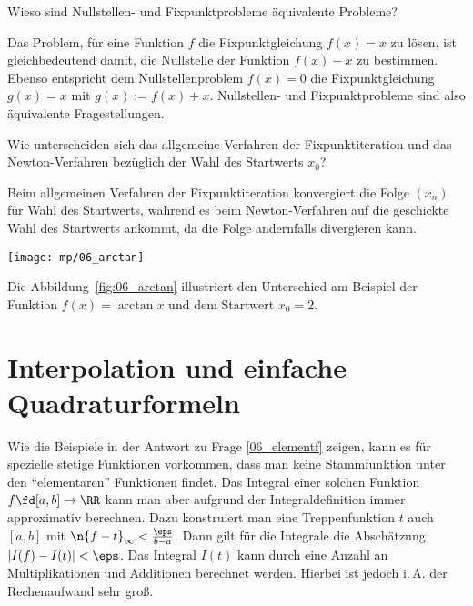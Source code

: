   \begin{frage}
    Wieso sind Nullstellen- und Fixpunktprobleme äquivalente Probleme?
  \end{frage}

  \begin{antwort}
    
    Das Problem, für eine Funktion $f$ die Fixpunktgleichung $f(x)=x$ 
    zu lösen, ist gleichbedeutend damit, die Nullstelle der Funktion 
    $f(x)-x$ zu bestimmen. Ebenso entspricht dem Nullstellenproblem $f(x)=0$ 
    die Fixpunktgleichung $g(x)=x$ mit $g(x):=f(x)+x$. 
    Nullstellen- und Fixpunktprobleme sind also äquivalente Fragestellungen. 
    \AntEnd
  \end{antwort}

  \begin{frage}
    Wie unterscheiden sich das allgemeine Verfahren der 
    Fixpunktiteration und das Newton-Verfahren bezüglich der Wahl des 
    Startwerts $x_0$?
  \end{frage}

  \begin{antwort}
    Beim allgemeinen Verfahren der Fixpunktiteration konvergiert die 
    Folge $(x_n)$ für  Wahl des Startwerts, 
    während es beim Newton-Verfahren auf die geschickte Wahl des Startwerts 
    ankommt, da die Folge andernfalls divergieren kann. 

    \begin{center}
      \texttt{[image: mp/06\_arctan]}
      \label{fig:06_arctan}
    \end{center}

    Die Abbildung~\ref{fig:06_arctan} 
    illustriert den Unterschied am Beispiel der Funktion 
    $f(x)=\arctan x$ und dem Startwert $x_0=2$. 
    \AntEnd 
  \end{antwort}

  \section{Interpolation und einfache Quadraturformeln}

  Wie die Beispiele in der Antwort zu Frage \ref{06_elementf} zeigen, kann 
  es für spezielle stetige Funktionen vorkommen, dass man keine 
  Stammfunktion unter den "`elementaren"' Funktionen findet. Das Integral einer 
  solchen Funktion $f\fd [a,b] \to \RR$ kann man aber aufgrund der 
  Integraldefinition immer approximativ berechnen. Dazu konstruiert man eine 
  Treppenfunktion $t$ auch $[a,b]$ mit $\n{ f-t }_\infty < \frac{\eps}{b-a}$. 
  Dann gilt für die Integrale die Abschätzung $|I(f)-I(t)| <\eps$. Das 
  Integral $I(t)$ kann durch eine  Anzahl an Multiplikationen 
  und Additionen berechnet werden. Hierbei ist jedoch i.\,A. der 
  Rechenaufwand sehr groß.  

